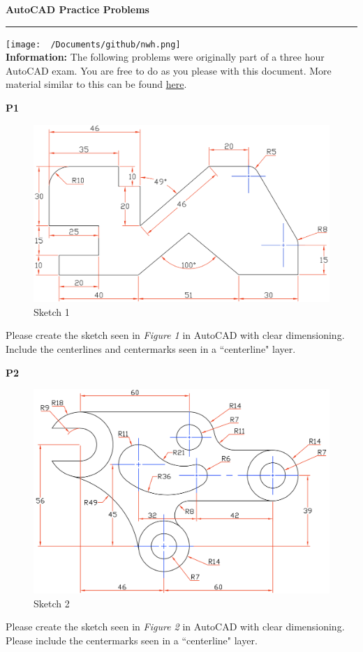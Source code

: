 \documentclass{article}
\begin{document}
\pagecolor{noah}
\center
\Huge{\textbf{AutoCAD Practice Problems}}\\[3mm] \hrule
\vspace{4mm}
\texttt{[image: ~/Documents/github/nwh.png]}\\[4mm] 
\justify\normalsize
\textbf{Information:} The following problems were originally part of a three hour AutoCAD exam. You are free to do as you please with this document. More material similar to this can be found \href{https://github.com/noahhaworth/CAD_Material}{here}.\\[10mm]
\newpage
{}

\textbf{P1}
\begin{figure}[H]
  \centering
  \includegraphics[width=.84\linewidth]{images/1.png}  
  \caption{Sketch 1}
  \label{fig:1}
\end{figure}
\noindent Please create the sketch seen in \textit{Figure 1} in AutoCAD with clear dimensioning. Include the centerlines and centermarks seen in a ``centerline" layer.

\textbf{P2}
\begin{figure}[H]
  \centering
  \includegraphics[width=.72\linewidth]{images/2.png}  
  \caption{Sketch 2}
  \label{fig:2}
\end{figure}
\noindent Please create the sketch seen in \textit{Figure 2} in AutoCAD with clear dimensioning. Please include the centermarks seen in a ``centerline" layer.
\end{document}

